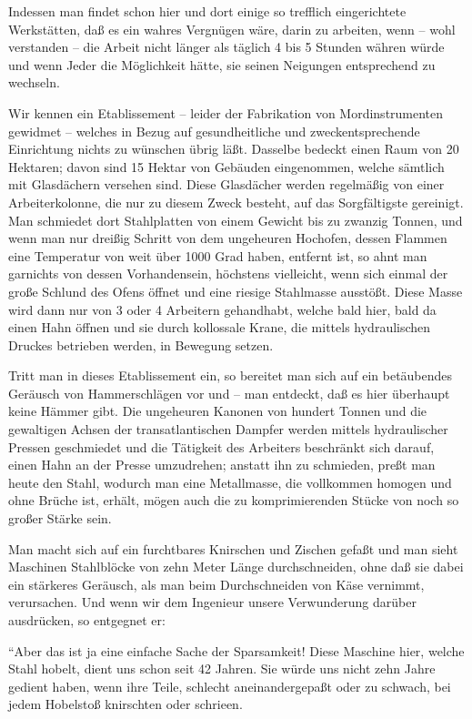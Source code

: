 \documentclass{scrbook}
\begin{document}
Indessen man findet schon hier und dort einige so trefflich eingerichtete Werkstätten, daß es ein wahres Vergnügen wäre, darin zu arbeiten, wenn – wohl verstanden – die Arbeit nicht länger als täglich 4 bis 5 Stunden währen würde und wenn Jeder die Möglichkeit hätte, sie seinen Neigungen entsprechend zu wechseln.

Wir kennen ein Etablissement – leider der Fabrikation von Mordinstrumenten gewidmet – welches in Bezug auf gesundheitliche und zweckentsprechende Einrichtung nichts zu wünschen übrig läßt. Dasselbe bedeckt einen Raum von 20 Hektaren; davon sind 15 Hektar von Gebäuden eingenommen, welche sämtlich mit Glasdächern versehen sind. Diese Glasdächer werden regelmäßig von einer Arbeiterkolonne, die nur zu diesem Zweck besteht, auf das Sorgfältigste gereinigt. Man schmiedet dort Stahlplatten von einem Gewicht bis zu zwanzig Tonnen, und wenn man nur dreißig Schritt von dem ungeheuren Hochofen, dessen Flammen eine Temperatur von weit über 1000 Grad haben, entfernt ist, so ahnt man garnichts von dessen Vorhandensein, höchstens vielleicht, wenn sich einmal der große Schlund des Ofens öffnet und eine riesige Stahlmasse ausstößt. Diese Masse wird dann nur von 3 oder 4 Arbeitern gehandhabt, welche bald hier, bald da einen Hahn öffnen und sie durch kollossale Krane, die mittels hydraulischen Druckes betrieben werden, in Bewegung setzen.

Tritt man in dieses Etablissement ein, so bereitet man sich auf ein betäubendes Geräusch von Hammerschlägen vor und – man entdeckt, daß es hier überhaupt keine Hämmer gibt. Die ungeheuren Kanonen von hundert Tonnen und die gewaltigen Achsen der transatlantischen Dampfer werden mittels hydraulischer Pressen geschmiedet und die Tätigkeit des Arbeiters beschränkt sich darauf, einen Hahn an der Presse umzudrehen; anstatt ihn zu schmieden, preßt man heute den Stahl, wodurch man eine Metallmasse, die vollkommen homogen und ohne Brüche ist, erhält, mögen auch die zu komprimierenden Stücke von noch so großer Stärke sein.

Man macht sich auf ein furchtbares Knirschen und Zischen gefaßt und man sieht Maschinen Stahlblöcke von zehn Meter Länge durchschneiden, ohne daß sie dabei ein stärkeres Geräusch, als man beim Durchschneiden von Käse vernimmt, verursachen. Und wenn wir dem Ingenieur unsere Verwunderung darüber ausdrücken, so entgegnet er:

``Aber das ist ja eine einfache Sache der Sparsamkeit! Diese Maschine hier, welche Stahl hobelt, dient uns schon seit 42 Jahren. Sie würde uns nicht zehn Jahre gedient haben, wenn ihre Teile, schlecht aneinandergepaßt oder zu schwach, bei jedem Hobelstoß knirschten oder schrieen.
\end{document}

